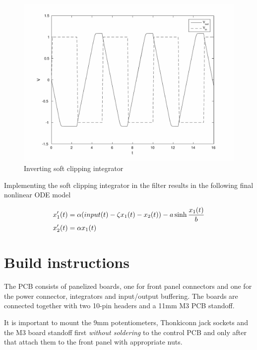 \documentclass{article}
\begin{document}
\begin{figure}[H]\centering
  \includegraphics[page=1, scale=0.58]{inverting_clipping_integrator2.pdf}
  \caption{Inverting soft clipping integrator}
  \label{fig:integrator}
\end{figure}

Implementing the soft clipping integrator in the filter results in the following final nonlinear ODE model 

\begin{align}
\begin{split}
x_{1}'(t) &= \alpha \space (input(t) - \zeta \space x_{1}(t) - x_{2}(t)) - a \space \sinh \frac{x_{1}(t)}{b} \\
x_{2}'(t) &= \alpha \space x_{1}(t) \\
\end{split}
\end{align}

\section{Build instructions} \label{buildinstructions}

The PCB consists of panelized boards, one for front panel connectors and one for the power connector, integrators and input/output buffering. The boards are connected together with two 10-pin headers and a 11mm M3 PCB standoff.\newline


It is important to mount the 9mm potentiometers, Thonkiconn jack sockets and the M3 board standoff first \emph{without soldering} to the control PCB and only after that attach them to the front panel with appropriate nuts. \newline
\end{document}
